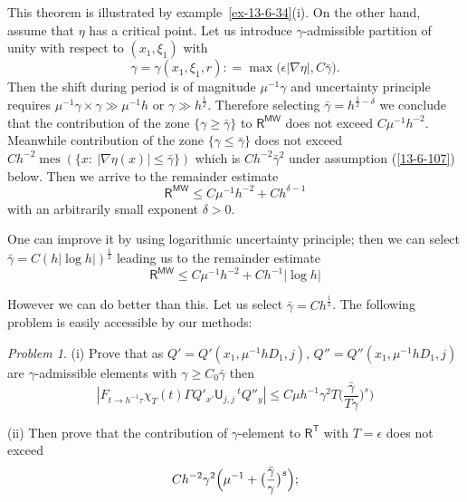 \documentclass[12pt,oneside,openany,article]{memoir}
\numberwithin{equation}{chapter}
\theoremstyle{plain}
\theoremstyle{definition}
\theoremstyle{remark}
\newtheorem{problem}[theorem]{Problem}
\numberwithin{equation}{chapter}
\begin{document}
This theorem is  illustrated by example~\ref{ex-13-6-34}(i). On the other hand, assume that $\eta$ has a critical point. Let us introduce  $\gamma$-admissible partition of unity with respect to $(x_1,\xi_1)$ with 
\begin{equation}
\gamma= \gamma (x_1,\xi_1, r){\mathrel{\mathop:}=} 
\max\bigl(\epsilon |\nabla \eta | ,C\bar{\gamma}\bigr).
\label{13-6-102}
\end{equation}
Then the shift during period is of magnitude $\mu^{-1}\gamma$ and uncertainty principle requires $\mu^{-1}\gamma \times \gamma \gg \mu^{-1}h$ or 
$\gamma \gg h^{\frac{1}{2}}$. Therefore selecting $\bar{\gamma}=h^{\frac{1}{2}-\delta}$ we conclude that the contribution of the zone $\{\gamma \ge \bar{\gamma}\}$ to ${{\mathsf{R}}}^{{\mathsf{MW}}} $ does not exceed $C\mu^{-1}h^{-2}$. Meanwhile contribution of the zone 
$\{\gamma \le \bar{\gamma}\}$ does not exceed 
$Ch^{-2}{\operatorname{mes}} (\{x:\ |\nabla \eta (x)|\le \bar{\gamma}\})$ which is 
$Ch^{-2}\bar{\gamma}^2$ under assumption (\ref{13-6-107}) below. Then we arrive to  the remainder estimate 
\begin{equation}
{{\mathsf{R}}}^{{\mathsf{MW}}} \le C\mu^{-1}h^{-2}+ Ch^{\delta -1}
\label{13-6-103}
\end{equation}
with an arbitrarily small exponent $\delta>0$.

One can improve it by using logarithmic uncertainty principle; then we can select $\bar{\gamma}=C(h|\log h|)^{\frac{1}{2}}$ leading us to the remainder estimate
\begin{equation}
{{\mathsf{R}}}^{{\mathsf{MW}}} \le C\mu^{-1}h^{-2}+ Ch^{-1}|\log h|
\label{13-6-104}
\end{equation}

However we can do better than this. Let us select 
$\bar{\gamma}= Ch^{\frac{1}{2}}$. The following problem is easily accessible by our methods:

\begin{problem}\label{problem-13-6-31}
(i) Prove that as $Q'=Q'(x_1,\mu^{-1}hD_1,j)$, $Q''=Q''(x_1,\mu^{-1}hD_1,j)$  are $\gamma$-admissible elements with $\gamma\ge C_0\bar{\gamma}$ then
\begin{equation}
|F_{t\to h^{-1}\tau}\chi_T(t)\Gamma Q'_{x'}{{\mathsf{U}}}_{j,j}{\,^t\!}Q''_y|
\le C \mu h^{-1} \gamma^2 T \bigl(\frac{\bar{\gamma}}{T \gamma}\bigr)^s\Bigr)
\label{13-6-105}
\end{equation}

\medskip\noindent
(ii) Then prove that the contribution of $\gamma$-element to ${{\mathsf{R}}}^{{\mathsf{T}}}$ with $T=\epsilon$ does not exceed
\begin{equation}
Ch^{-2}\gamma^2 \Bigl( \mu^{-1} + \bigl(\frac{\bar{\gamma}}{\gamma}\bigr)^s\Bigr);
\label{13-6-106}
\end{equation}
\end{problem}
\end{document}
